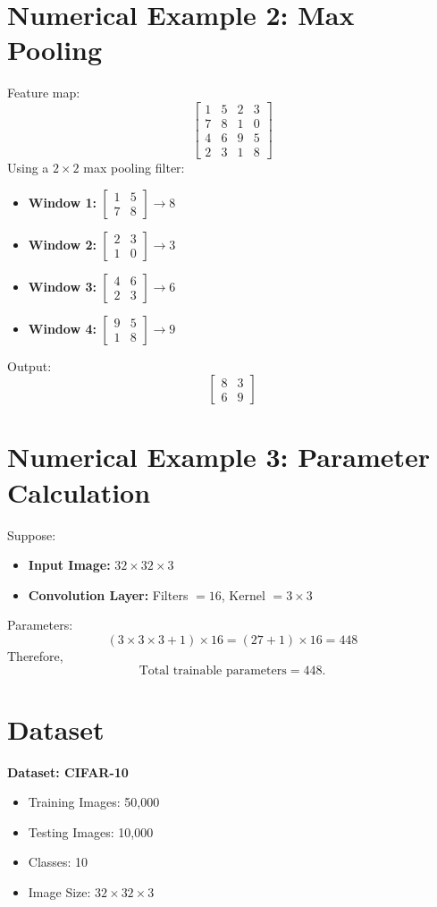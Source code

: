 \documentclass[11pt]{article}
\begin{document}
\section{Numerical Example 2: Max Pooling}
Feature map:
\[
\begin{bmatrix}
1 & 5 & 2 & 3 \\
7 & 8 & 1 & 0 \\
4 & 6 & 9 & 5 \\
2 & 3 & 1 & 8
\end{bmatrix}
\]
Using a $2 \times 2$ max pooling filter:
\begin{itemize}[label={}]
    \item \textbf{Window 1:} $\begin{bmatrix} 1 & 5 \\ 7 & 8 \end{bmatrix} \rightarrow 8$
    \item \textbf{Window 2:} $\begin{bmatrix} 2 & 3 \\ 1 & 0 \end{bmatrix} \rightarrow 3$
    \item \textbf{Window 3:} $\begin{bmatrix} 4 & 6 \\ 2 & 3 \end{bmatrix} \rightarrow 6$
    \item \textbf{Window 4:} $\begin{bmatrix} 9 & 5 \\ 1 & 8 \end{bmatrix} \rightarrow 9$
\end{itemize}
Output:
\[
\begin{bmatrix} 8 & 3 \\ 6 & 9 \end{bmatrix}
\]

\section{Numerical Example 3: Parameter Calculation}
Suppose:
\begin{itemize}
    \item \textbf{Input Image:} $32 \times 32 \times 3$
    \item \textbf{Convolution Layer:} Filters $= 16$, Kernel $= 3 \times 3$
\end{itemize}
Parameters:
\[
(3 \times 3 \times 3 + 1) \times 16 = (27 + 1) \times 16 = 448
\]
Therefore,
\[
\text{Total trainable parameters} = 448.
\]
\clearpage
\section{Dataset}
\textbf{Dataset: CIFAR-10}
\begin{itemize}
    \item Training Images: 50,000
    \item Testing Images: 10,000
    \item Classes: 10
    \item Image Size: $32 \times 32 \times 3$
\end{itemize}
\end{document}
